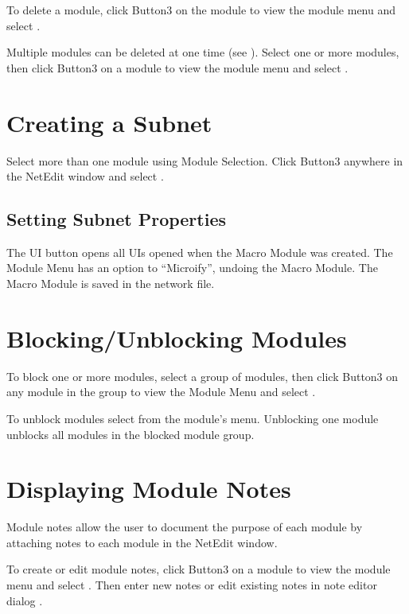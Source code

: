 To delete a module, click Button3 on the module to view the module menu
and select .

Multiple modules can be deleted at one time
(see ).
Select one or more modules, then click Button3 on a module to view the
module menu and select . 

\section{Creating a Subnet}
\label{sec:subnet}

Select more than one module using Module Selection. Click Button3
anywhere in the NetEdit window and select .

\subsection{Setting Subnet Properties}

The UI button opens all UIs opened when the Macro Module was created.
The Module Menu has an option to ``Microify'', undoing the Macro
Module. The Macro Module is saved in the network file.

\section{Blocking/Unblocking Modules}
\label{sec:modblocking}


To block one or more modules, select a group of modules, then  click
Button3 on any module in the group to view the Module Menu and
select .

To unblock modules select  from the
module's menu.  Unblocking one module unblocks all modules in the
blocked module group.

\section{Displaying Module Notes}
\label{sec:modnotes}

Module notes allow the user to document the purpose of
each module by attaching notes to each module in the NetEdit window.

To create or edit module notes, click Button3 on a module to view the
module menu and select . Then enter new notes or edit
existing notes in note editor dialog .

